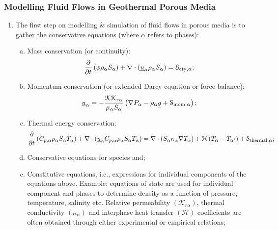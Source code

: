 \documentclass[10pt,compress,unknownkeysallowed]{beamer}
\begin{document}
\begin{frame}
 \frametitle{Modelling Fluid Flows in Geothermal Porous Media}
    \begin{enumerate}[1.]\scriptsize
       \item <1-> The first step on modelling $\&$ simulation of fluid flows in porous media is to gather the conservative equations (where $\alpha$ refers to phases):
          \begin{enumerate}[(a)]\scriptsize
             \item <2-> Mass conservation (or continuity):
                \begin{equation}
                   \displaystyle\frac{\partial}{\partial t} \left(\phi\rho_{\alpha}S_{\alpha}\right) + \nabla\cdot\left(\underline{u}_{\alpha}\rho_{\alpha}S_{\alpha}\right) = \mathcal{S}_{\text{cty},\alpha};\label{eqn:continuity}
                \end{equation}
             \item <3-> Momentum conservation (or extended Darcy equation or force-balance):
                \begin{equation}
                   \underline{u}_{\alpha} = - \displaystyle\frac{\mathcal{K}\mathcal{K}_{r\alpha}}{\mu_{\alpha}S_{\alpha}}\left(\nabla P_{\alpha} - \rho_{\alpha}\underline{g} + \mathcal{S}_{\text{mom},\alpha}\right);\label{eqn:momentum}
                \end{equation}
             \item <4-> Thermal energy conservation:
                \begin{equation}
                   \displaystyle\frac{\partial}{\partial t} \left(C_{p,\alpha}\rho_{\alpha}S_{\alpha}T_{\alpha}\right) + \nabla\cdot\left(\underline{u}_{\alpha}C_{p,\alpha}\rho_{\alpha}S_{\alpha}T_{\alpha}\right) = \nabla\cdot\left(S_{\alpha}\kappa_{\alpha}\nabla T_{\alpha}\right) + \mathcal{H}\left(T_{\alpha}-T_{\alpha'}\right) + \mathcal{S}_{\text{thermal},\alpha};\label{eqn:energy}
                \end{equation}
             \item <5-> Conservative equations for species and;
             \item <5-> Constitutive equations, i.e., expressions for individual components of the equations above. Example: equations of state are used for individual component and phases to determine density as a function of pressure, temperature, salinity etc. Relative permeability $\left(\mathcal{K}_{r\alpha}\right)$, thermal conductivity $\left(\kappa_{\alpha}\right)$ and interphase heat transfer $\left(\mathcal{H}\right)$ coefficients are often obtained through either experimental or empirical relations;
          \end{enumerate}
    \end{enumerate}

\end{frame}
\end{document}

